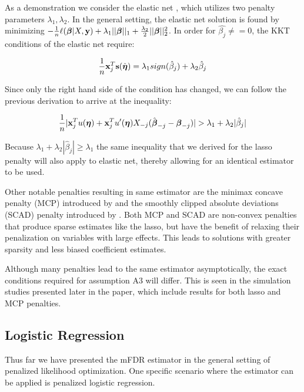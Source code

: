 As a demonstration we consider the elastic net \citep{Elastic_Net}, which utilizes two penalty parameters $\lambda_1, \lambda_2$. In the general setting, the elastic net solution is found by minimizing $-\frac{1}{n} \ell(\boldsymbol{\beta}|X,\mathbf{y}) + \lambda_1 ||\boldsymbol{\beta}||_1 + \frac{\lambda_2}{2}||\boldsymbol{\beta}||_{2}^2 $. In order for $\hat{\beta_j} \neq = 0$, the KKT conditions of the elastic net \citep{lasso_kkt} require:

\begin{equation*}
\frac{1}{n}\mathbf{x}_{j}^T \mathbf{s}(\hat{\boldsymbol{\eta}}) = \lambda_1 sign(\hat{\beta}_j) + \lambda_2 \hat{\beta}_j
\end{equation*}

Since only the right hand side of the condition has changed, we can follow the previous derivation to arrive at the inequality:

\begin{equation*}
\frac{1}{n}|\mathbf{x}_j^T  u(\boldsymbol{\eta}) + \mathbf{x}_j^T u'(\boldsymbol{\eta})X_{-j}(\hat{\boldsymbol{\beta}}_{-j} -  \boldsymbol{\beta}_{-j}) |  > \lambda_1  + \lambda_2|\hat{\beta}_j|
\end{equation*}

Because $\lambda_1  + \lambda_2|\hat{\beta}_j| \geq \lambda_1$ the same inequality that we derived for the lasso penalty will also apply to elastic net, thereby allowing for an identical estimator to be used.

Other notable penalties resulting in same estimator are the minimax concave penalty (MCP) introduced by \citet{MCP} and the smoothly clipped absolute deviations (SCAD) penalty introduced by \citet{SCAD}.  Both MCP and SCAD are non-convex penalties that produce sparse estimates like the lasso, but have the benefit of relaxing their penalization on variables with large effects.  This leads to solutions with greater sparsity and less biased coefficient estimates.

Although many penalties lead to the same estimator asymptotically, the exact conditions required for assumption A3 will differ. This is seen in the simulation studies presented later in the paper, which include results for both lasso and MCP penalties.

\subsection{Logistic Regression}

Thus far we have presented the mFDR estimator in the general setting of penalized likelihood optimization. One specific scenario where the estimator can be applied is penalized logistic regression.  

